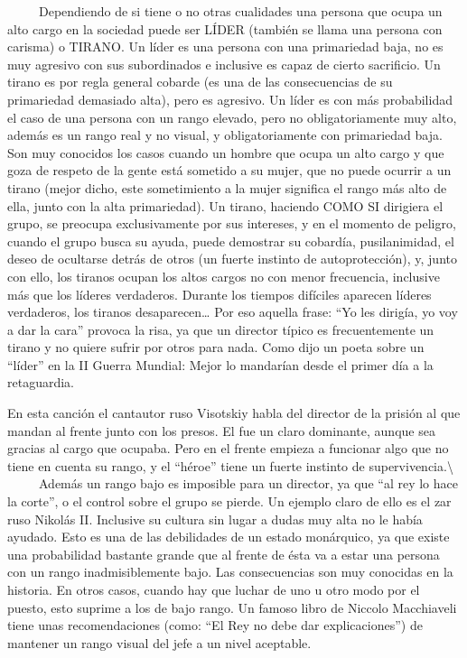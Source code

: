 ~ ~ ~ Dependiendo de si tiene o no otras cualidades una persona que
ocupa un alto cargo en la sociedad puede ser LÍDER (también se llama una
persona con carisma) o TIRANO. Un líder es una persona con una
primariedad baja, no es muy agresivo con sus subordinados e inclusive es
capaz de cierto sacrificio. Un tirano es por regla general cobarde (es
una de las consecuencias de su primariedad demasiado alta), pero es
agresivo. Un líder es con más probabilidad el caso de una persona con un
rango elevado, pero no obligatoriamente muy alto, además es un rango
real y no visual, y obligatoriamente con primariedad baja. Son muy
conocidos los casos cuando un hombre que ocupa un alto cargo y que goza
de respeto de la gente está sometido a su mujer, que no puede ocurrir a
un tirano (mejor dicho, este sometimiento a la mujer significa el rango
más alto de ella, junto con la alta primariedad). Un tirano, haciendo
COMO SI dirigiera el grupo, se preocupa exclusivamente por sus
intereses, y en el momento de peligro, cuando el grupo busca su ayuda,
puede demostrar su cobardía, pusilanimidad, el deseo de ocultarse detrás
de otros (un fuerte instinto de autoprotección), y, junto con ello, los
tiranos ocupan los altos cargos no con menor frecuencia, inclusive más
que los líderes verdaderos. Durante los tiempos difíciles aparecen
líderes verdaderos, los tiranos desaparecen\ldots{} Por eso aquella
frase: ``Yo les dirigía, yo voy a dar la cara'' provoca la risa, ya que
un director típico es frecuentemente un tirano y no quiere sufrir por
otros para nada. Como dijo un poeta sobre un ``líder'' en la II Guerra
Mundial: Mejor lo mandarían desde el primer día a la retaguardia.

En esta canción el cantautor ruso Visotskiy habla del director de la
prisión al que mandan al frente junto con los presos. El fue un claro
dominante, aunque sea gracias al cargo que ocupaba. Pero en el frente
empieza a funcionar algo que no tiene en cuenta su rango, y el ``héroe''
tiene un fuerte instinto de supervivencia.\textbackslash{} ~ ~ ~ Además
un rango bajo es imposible para un director, ya que ``al rey lo hace la
corte'', o el control sobre el grupo se pierde. Un ejemplo claro de ello
es el zar ruso Nikolás II. Inclusive su cultura sin lugar a dudas muy
alta no le había ayudado. Esto es una de las debilidades de un estado
monárquico, ya que existe una probabilidad bastante grande que al frente
de ésta va a estar una persona con un rango inadmisiblemente bajo. Las
consecuencias son muy conocidas en la historia. En otros casos, cuando
hay que luchar de uno u otro modo por el puesto, esto suprime a los de
bajo rango. Un famoso libro de Niccolo Macchiaveli tiene unas
recomendaciones (como: ``El Rey no debe dar explicaciones'') de mantener
un rango visual del jefe a un nivel aceptable.

